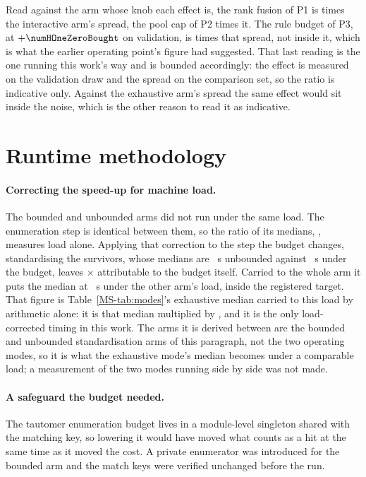 \documentclass[journal=jcisd8,manuscript=suppinfo,layout=onecolumn]{achemso}
\begin{document}
Read against the arm whose knob each effect is, the rank fusion of P1 is \numSpreadPOneInsd{}
times the interactive arm's spread, the pool cap of P2 \numSpreadPTwoInsd{} times it. The rule
budget of P3, at $+\numHOneZeroBought$ on validation, is \numSpreadPThreeInsd{} times that spread,
not inside it, which is what the earlier operating point's figure had suggested. That last reading
is the one running this work's way and is bounded accordingly: the effect is measured on the
validation draw and the spread on the comparison set, so the ratio is indicative only. Against the
exhaustive arm's spread the same effect would sit inside the noise, which is the other reason to
read it as indicative.

\section{Runtime methodology}
\label{sec:si-runtime}

\paragraph{Correcting the speed-up for machine load.} The bounded and unbounded arms did not run
under the same load. The enumeration step is identical between them, so the ratio of its medians,
\numHOneFiveLoad{}, measures load alone. Applying that correction to the step the budget changes,
standardising the survivors, whose medians are \numHOneFiveStdunbounded~s unbounded against
\numHOneFiveStdbounded~s under the budget, leaves \numHOneFiveAttributable$\times$ attributable
to the budget itself. Carried to the whole arm it puts the median at
\numHOneFiveMedianUnderload~s under the other arm's load, inside the registered target. That
figure is Table~\ref{MS-tab:modes}'s exhaustive median carried to this load by arithmetic alone:
it is that median multiplied by \numHOneFiveLoad{}, and it is the only load-corrected
timing in this work. The arms it is derived between are the bounded and unbounded standardisation
arms of this paragraph, not the two operating modes, so it is what the exhaustive mode's median
becomes under a comparable load; a measurement of the two modes running side by side was not made.

\paragraph{A safeguard the budget needed.} The tautomer enumeration budget lives in a
module-level singleton shared with the matching key, so lowering it would have moved what counts
as a hit at the same time as it moved the cost. A private enumerator was introduced for the
bounded arm and the match keys were verified unchanged before the run.
\end{document}
